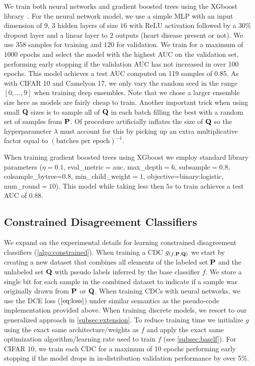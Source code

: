We train both neural networks and gradient boosted trees using the XGboost library~\citep{xgb}.
For the neural network model, we use a simple MLP with an input dimension of $9$, $3$ hidden layers of size $16$ with ReLU activation followed by a $30\%$ dropout layer and a linear layer to $2$ outputs (heart disease present or not).
We use $358$ samples for training and $120$ for validation.
We train for a maximum of $1000$ epochs and select the model with the highest AUC on the validation set, performing early stopping if the validation AUC has not increased in over 100 epochs.
This model achieves a test AUC computed on 119 samples of 0.85.
As with CIFAR 10 and Camelyon 17, we only vary the random seed in the range $[0,\dots,9]$ when training deep ensembles. Note that we chose a larger ensemble size here as models are fairly cheap to train.
Another important trick when using small $\mathbf{Q}$ sizes is to sample all of $\mathbf{Q}$ in each batch filling the best with a random set of samples from $\mathbf{P}$. Of procedure artificially inflates the size of $\mathbf{Q}$ so the hyperparameter $\lambda$ must account for this by picking up an extra multiplicative factor equal to $(\text{batches per epoch})^{-1}$.

When training gradient boosted trees using XGboost we employ standard library parameters ($\eta=0.1$, eval\_metric$=$auc, max\_depth$=6$, subsample$=0.8$, colsample\_bytree=$0.8$, min\_child\_weight$=1$, objective=binary:logistic, num\_round$=10$).
This model while taking less then $5s$ to train achieves a test AUC of 0.88.

\subsection{Constrained Disagreement Classifiers}
\label{subsec:constr}
We expand on the experimental details for learning constrained disagreement classifiers (\autoref{algo:constrained}).
When training a CDC $g_{(f,\mathbf{P}, \mathbf{Q})}$ we start by creating a new dataset that combines all elements of the labeled set $\mathbf{P}$ and the unlabeled set $\mathbf{Q}$ with pseudo labels inferred by the base classifier $f$.
We store a single bit for each sample in the combined dataset to indicate if a sample was originally drawn from $\mathbf{P}$ or $\mathbf{Q}$.
When training CDCs with neural networks, we use the DCE loss ($\autoref{eq:loss}$)
under similar semantics as the pseudo-code implementation provided above.
When training discrete models, we resort to our generalized approach in \autoref{subsec:extension}.
To reduce training time we initialize $g$ using the exact same architecture/weights
as $f$ and apply the exact same optimization algorithm/learning rate used to train $f$ (see \autoref{subsec:basclf}).
For CIFAR 10, we train each CDC for a maximum of 10 epochs performing early stopping if the model drops in in-distribution validation performance
by over 5\%.

